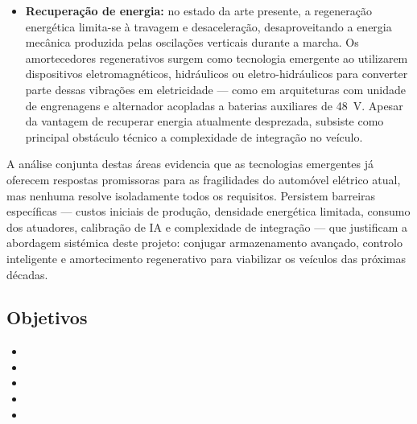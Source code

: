 \begin{campotexto}
\begin{itemize}
    \item \textbf{Recuperação de energia:} no estado da arte presente, a regeneração energética limita-se à travagem e desaceleração, desaproveitando a energia mecânica produzida pelas oscilações verticais durante a marcha. Os amortecedores regenerativos surgem como tecnologia emergente ao utilizarem dispositivos eletromagnéticos, hidráulicos ou eletro-hidráulicos para converter parte dessas vibrações em eletricidade --- como em arquiteturas com unidade de engrenagens e alternador acopladas a baterias auxiliares de 48~V. Apesar da vantagem de recuperar energia atualmente desprezada, subsiste como principal obstáculo técnico a complexidade de integração no veículo.
\end{itemize}
A análise conjunta destas áreas evidencia que as tecnologias emergentes já oferecem respostas promissoras para as fragilidades do automóvel elétrico atual, mas nenhuma resolve isoladamente todos os requisitos. Persistem barreiras específicas --- custos iniciais de produção, densidade energética limitada, consumo dos atuadores, calibração de IA e complexidade de integração --- que justificam a abordagem sistémica deste projeto: conjugar armazenamento avançado, controlo inteligente e amortecimento regenerativo para viabilizar os veículos das próximas décadas.
\end{campotexto}

\subsection{Objetivos}
\begin{campotexto}
\begin{itemize}[leftmargin=1.4em, itemsep=2pt, topsep=4pt]
  \item {}
  \item {}
  \item {}
  \item {}
  \item {}
\end{itemize}
\end{campotexto}

